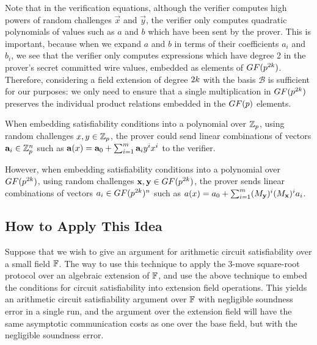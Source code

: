 Note that in the verification equations, although the verifier computes high powers of random challenges $\vec{x}$ and $\vec{y}$, the verifier only computes quadratic polynomials of values such as $a$ and $b$ which have been sent by the prover. This is important, because when we expand $a$ and $b$ in terms of their coefficients $a_i$ and $b_i$, we see that the verifier only computes expressions which have degree 2 in the prover's secret committed wire values, embedded as elements of $GF(p^{2k})$. Therefore, considering a field extension of degree $2k$ with the basis $\mathcal{B}$ is sufficient for our purposes: we only need to ensure that a single multiplication in $GF(p^{2k})$ preserves the individual product relations embedded in the $GF(p)$ elements.

When embedding satisfiability conditions into a polynomial over $\mathbb{Z}_p$, using random challenges $x,y \in \mathbb{Z}_p$, the prover could send linear combinations of vectors $\mathbf{a}_i \in \mathbb{Z}_p^n$ such as $ \mathbf{a}(x)=\mathbf{a}_0 + \sum_{i=1}^m \mathbf{a}_{i}y^i x^{i} $
to the verifier.

However, when embedding satisfiability conditions into a polynomial over $GF(p^{2k})$, using random challenges $\mathbf{x},\mathbf{y} \in GF(p^{2k})$, the prover sends linear combinations of vectors $a_i \in GF(p^{2k})^n$ such as
$ a(x)=a_0 + \sum_{i=1}^m (M_{\mathbf{y}})^i (M_{\mathbf{x}})^i a_{i} $.

\subsection{How to Apply This Idea}

Suppose that we wish to give an argument for arithmetic circuit satisfiability over a small field $\mathbb{F}$. The way to use this technique to apply the 3-move square-root protocol over an algebraic extension of $\mathbb{F}$, and use the above technique to embed the conditions for circuit satisfiability into extension field operations. This yields an arithmetic circuit satisfiability argument over $\mathbb{F}$ with negligible soundness error in a single run, and the argument over the extension field will have the same asymptotic communication costs as one over the base field, but with the negligible soundness error.